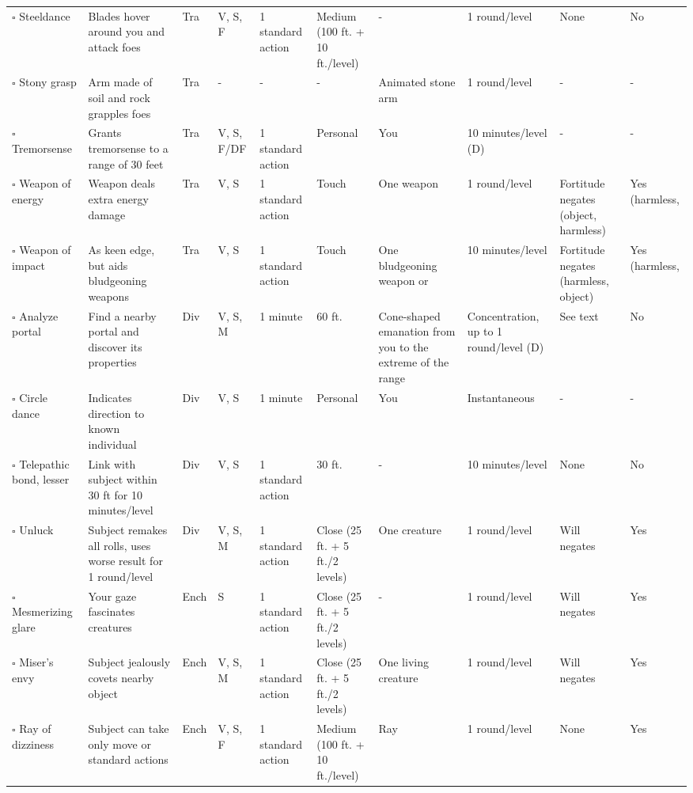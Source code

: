 \documentclass[12pt, a4paper]{article}
\begin{document}
\begin{center}
\begin{longtable}[H]{ p{8em} p{15em} p{2em} p{5em} p{6em} p{6em} p{10em} p{6em} p{5em} p{2em} }
    \(\square\) Steeldance & Blades hover around you and attack foes & Tra & V, S, F & 1 standard action & Medium (100 ft. + 10 ft./level) & - & 1 round/level & None & No\\
    \(\square\) Stony grasp & Arm made of soil and rock grapples foes & Tra & - & - & - & Animated stone arm & 1 round/level & - & -\\
    \(\square\) Tremorsense & Grants tremorsense to a range of 30 feet & Tra & V, S, F/DF & 1 standard action & Personal & You & 10 minutes/level (D) & - & -\\
    \(\square\) Weapon of energy & Weapon deals extra energy damage & Tra & V, S & 1 standard action & Touch & One weapon & 1 round/level & Fortitude negates (object, harmless) & Yes (harmless, \\
    \(\square\) Weapon of impact & As keen edge, but aids bludgeoning weapons & Tra & V, S & 1 standard action & Touch & One bludgeoning weapon or  & 10 minutes/level & Fortitude negates (harmless, object) & Yes (harmless, \\
    \(\square\) Analyze portal & Find a nearby portal and discover its properties & Div & V, S, M & 1 minute & 60 ft. & Cone-shaped emanation from you to the extreme of the range & Concentration, up to 1 round/level (D) & See text & No\\
    \(\square\) Circle dance & Indicates direction to known individual & Div & V, S & 1 minute & Personal & You & Instantaneous & - & -\\
    \(\square\) Telepathic bond, lesser & Link with subject within 30 ft for 10 minutes/level & Div & V, S & 1 standard action & 30 ft. & - & 10 minutes/level & None & No\\
    \(\square\) Unluck & Subject remakes all rolls, uses worse result for 1 round/level & Div & V, S, M & 1 standard action & Close (25 ft. + 5 ft./2 levels) & One creature & 1 round/level & Will negates & Yes\\
    \(\square\) Mesmerizing glare & Your gaze fascinates creatures & Ench & S & 1 standard action & Close (25 ft. + 5 ft./2 levels) & - & 1 round/level & Will negates & Yes\\
    \(\square\) Miser’s envy & Subject jealously covets nearby object & Ench & V, S, M & 1 standard action & Close (25 ft. + 5 ft./2 levels) & One living creature & 1 round/level & Will negates & Yes\\
    \(\square\) Ray of dizziness & Subject can take only move or standard actions & Ench & V, S, F & 1 standard action & Medium (100 ft. + 10 ft./level) & Ray & 1 round/level & None & Yes\\

\end{longtable}
\end{center}
\end{document}

